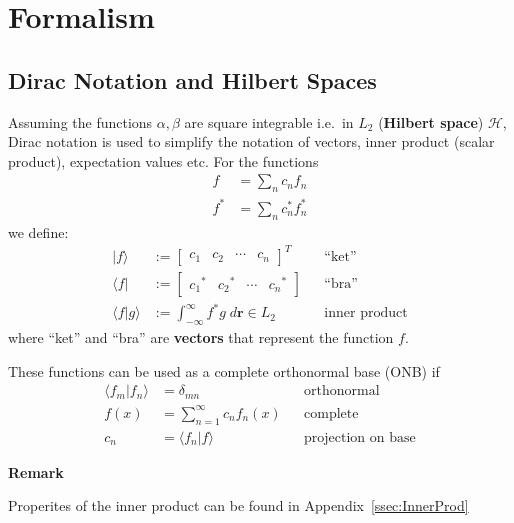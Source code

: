 \section{Formalism}

\subsection{Dirac Notation and Hilbert Spaces}
Assuming the functions $\alpha, \beta$ are square integrable i.e.\ in $L_2$ (\textbf{Hilbert space}) $\mathcal{H}$,
Dirac notation is used to simplify the notation of vectors, inner product (scalar product), expectation values etc. For the functions
\begin{align*}
    f   & = \sum_n c_n f_n     \\
    f^* & = \sum_n c_n^* f_n^*
\end{align*}
we define:
\noindent\begin{align*}
    |f\rangle           & := \begin{bmatrix}
                                 c_1 & c_2 & \cdots & c_n
                             \end{bmatrix}^T                               &  & \text{``ket''}              \\
    \langle f|          & := \begin{bmatrix}
                                 {c_1}^* & {c_2}^* & \cdots & {c_n}^*
                             \end{bmatrix}                   &  & \text{``bra''}                            \\
    \langle f|g \rangle & := \int_{-\infty}^{\infty} f^* g\; d \mathbf{r} \in L_2 &  & \text{inner product}
\end{align*}
where ``ket'' and ``bra'' are \textbf{vectors} that represent the function $f$.

These functions can be used as a complete orthonormal base (ONB) if
\noindent\begin{align*}
    \langle f_m|f_n \rangle & = \delta_{mn}                    &  & \text{orthonormal}        \\
    f(x)                    & = \sum_{n=1}^{\infty} c_n f_n(x) &  & \text{complete}           \\
    c_n                     & = \langle f_n|f \rangle          &  & \text{projection on base}
\end{align*}

\textbf{Remark}

Properites of the inner product can be found in Appendix\ \ref{ssec:InnerProd}

